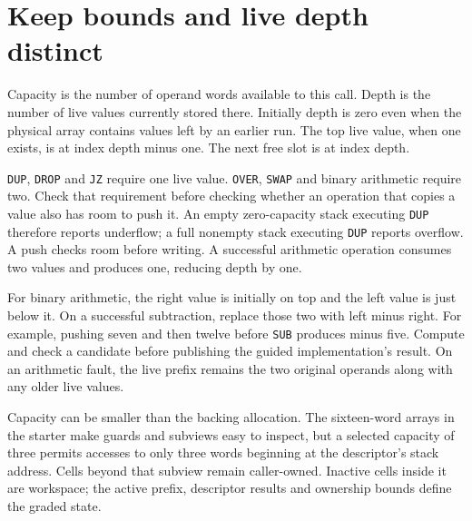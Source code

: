 \section{Keep bounds and live depth distinct}\label{vm-stack}
Capacity is the number of operand words available to this call. Depth is the number
of live values currently stored there. Initially depth is zero even when the physical
array contains values left by an earlier run. The top live value, when one exists,
is at index depth minus one. The next free slot is at index depth.

\texttt{DUP}, \texttt{DROP} and \texttt{JZ} require one live value. \texttt{OVER},
\texttt{SWAP} and binary arithmetic require two. Check that requirement before
checking whether an operation that copies a value also has room to push it.
An empty zero-capacity stack executing \texttt{DUP} therefore reports underflow;
a full nonempty stack executing \texttt{DUP} reports overflow. A push checks room
before writing. A successful arithmetic operation consumes two values and produces
one, reducing depth by one.

For binary arithmetic, the right value is initially on top and the left value is
just below it. On a successful subtraction, replace those two with left minus right.
For example, pushing seven and then twelve before \texttt{SUB} produces minus five.
Compute and check a candidate before publishing the guided implementation's result.
On an arithmetic fault, the live prefix remains the two original operands along
with any older live values.

Capacity can be smaller than the backing allocation. The sixteen-word arrays in the
starter make guards and subviews easy to inspect, but a selected capacity of three
permits accesses to only three words beginning at the descriptor's stack address.
Cells beyond that subview remain caller-owned. Inactive cells inside it are workspace;
the active prefix, descriptor results and ownership bounds define the graded state.
